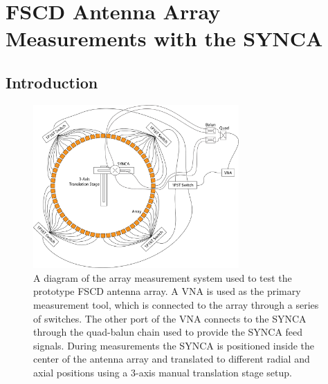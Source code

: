 
\section{FSCD Antenna Array Measurements with the SYNCA}
\label{sec:chap5-fscd-array-measurements}

\subsection{Introduction}
\begin{figure}[htbp]
    \centering
    \includegraphics[width=0.7\textwidth]{figs/Chapter-5/230410_jugaad_system.png}
    \caption{A diagram of the array measurement system used to test the prototype FSCD antenna array. A VNA is used as the primary measurement tool, which is connected to the array through a series of switches. The other port of the VNA connects to the SYNCA through the quad-balun chain used to provide the SYNCA feed signals. During measurements the SYNCA is positioned inside the center of the antenna array and translated to different radial and axial positions using a 3-axis manual translation stage setup.}
    \label{fig:jugaad_system}
\end{figure}

